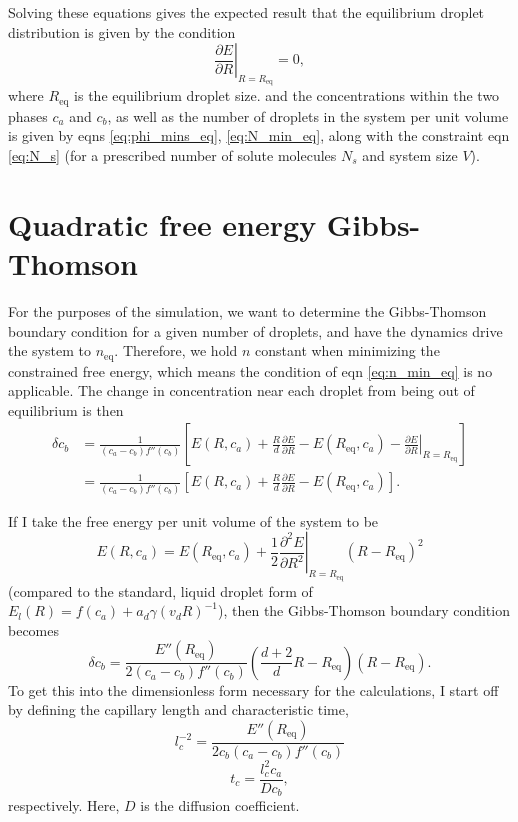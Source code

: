 \documentclass[12pt]{article}
\begin{document}
Solving these equations gives the expected result that the equilibrium droplet distribution is given by the condition
\begin{equation}\label{eq:bulk_FE0}
\left.\frac{\partial E}{\partial R}\right|_{R=R_{\text{eq}}}=0,
\end{equation}
where $R_{\text{eq}}$ is the equilibrium droplet size.
and the concentrations within the two phases $c_a$ and $c_b$, as well as the number of droplets in the system per unit volume is given by eqns \ref{eq:phi_mins_eq}, \ref{eq:N_min_eq}, along with the constraint eqn \ref{eq:N_s} (for a prescribed number of solute molecules $N_s$ and system size $V$).

\section{Quadratic free energy Gibbs-Thomson}
For the purposes of the simulation, we want to determine the Gibbs-Thomson boundary condition for a given number of droplets, and have the dynamics drive the system to $n_{\text{eq}}$. Therefore, we hold $n$ constant when minimizing the constrained free energy, which means the condition of eqn \ref{eq:n_min_eq} is no applicable. The change in concentration near each droplet from being out of equilibrium is then
\begin{align}\label{eq:GT}
\delta c_b&=\frac{1}{(c_a-c_b)f''(c_b)}\left[E(R,c_a)+\frac{R}{d}\frac{\partial E}{\partial R}-E(R_{\text{eq}},c_a)-\left.\frac{\partial E}{\partial R}\right|_{R=R_{\text{eq}}}\right]\nonumber\\
&=\frac{1}{(c_a-c_b)f''(c_b)}\left[E(R,c_a)+\frac{R}{d}\frac{\partial E}{\partial R}-E(R_{\text{eq}},c_a)\right].
\end{align}

If I take the free energy per unit volume of the system to be
\begin{equation}\label{eq:E_per_V}
E(R,c_a)=E(R_{\text{eq}},c_a)+\frac{1}{2}\left.\frac{\partial^2 E}{\partial R^2}\right|_{R=R_{\text{eq}}}(R-R_{\text{eq}})^2
\end{equation}
(compared to the standard, liquid droplet form of $E_l(R)=f(c_a)+a_d\gamma (v_dR)^{-1}$), then the Gibbs-Thomson boundary condition becomes
\begin{equation}\label{eq:GT_quad_dim}
\delta c_b=\frac{E''(R_{\text{eq}})}{2(c_a-c_b)f''(c_b)}\left(\frac{d+2}{d}R-R_{\text{eq}}\right)(R-R_{\text{eq}}).
\end{equation}
To get this into the dimensionless form necessary for the calculations, I start off by defining the capillary length and characteristic time,
\begin{equation}\label{eq:capillary}
l_c^{-2} = \frac{E''(R_{\text{eq}})}{2c_b(c_a-c_b)f''(c_b)}
\end{equation}
\begin{equation}\label{eq:c_time}
t_c=\frac{l_c^2c_a}{Dc_b},
\end{equation}
respectively. Here, $D$ is the diffusion coefficient.
\end{document}
